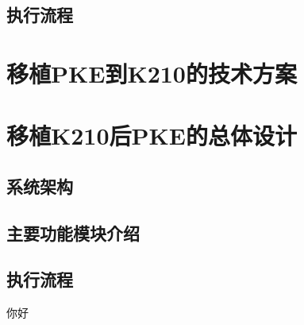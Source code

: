 \subsection{执行流程}

\section{移植PKE到K210的技术方案}

\section{移植K210后PKE的总体设计}

\subsection{系统架构}

\subsection{主要功能模块介绍}

\subsection{执行流程}
你好
